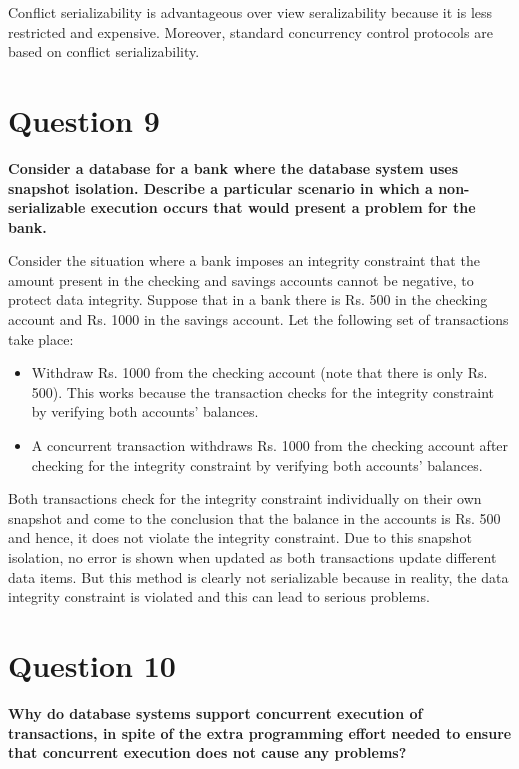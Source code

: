 \documentclass[12pt]{article}
\begin{document}
Conflict serializability is advantageous over view seralizability because it is less restricted and expensive. Moreover, standard concurrency control protocols are based on conflict serializability.

\section*{Question 9}
{\bfseries Consider a database for a bank where the database system uses snapshot isolation. Describe a particular scenario in which a non-serializable execution occurs that would present a problem for the bank.}

Consider the situation where a bank imposes an integrity constraint that the amount present in the checking and savings accounts cannot be negative, to protect data integrity. Suppose that in a bank there is Rs. 500 in the checking account and Rs. 1000 in the savings account. Let the following set of transactions take place:
\begin{itemize}
    \item Withdraw Rs. 1000 from the checking account (note that there is only Rs. 500). This works because the transaction checks for the integrity constraint by verifying both accounts' balances.
    \item A concurrent transaction withdraws Rs. 1000 from the checking account after checking for the integrity constraint by verifying both accounts' balances.
\end{itemize}

Both transactions check for the integrity constraint individually on their own snapshot and come to the conclusion that the balance in the accounts is Rs. 500 and hence, it does not violate the integrity constraint. Due to this snapshot isolation, no error is shown when updated as both transactions update different data items. But this method is clearly not serializable because in reality, the data integrity constraint is violated and this can lead to serious problems.
\section*{Question 10}
{\bfseries Why do database systems support concurrent execution of transactions, in spite of the extra programming effort needed to ensure that concurrent execution does not cause any problems?}
\end{document}
